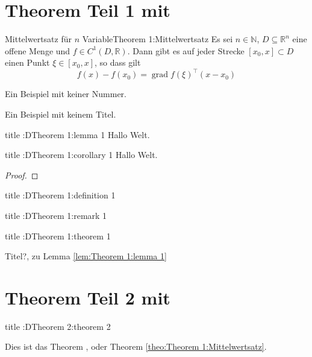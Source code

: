 \chapter{Theorem Teil 1 mit \texorpdfstring{}{tcolorbox}}%
\label{chap:Theorem 1}%
\lipsum[1-1]%
\begin{theorem}{Mittelwertsatz f\"{u}r $n$ Variable}{Theorem 1:Mittelwertsatz}%
	Es sei $n\in\mathbb{N}$, $D\subseteq\mathbb{R}^n$ eine offene Menge und $f\in C^{1}(D,\mathbb{R})$. Dann gibt es auf jeder Strecke $[x_0,x]\subset D$ einen Punkt $\xi\in[x_0,x]$, so dass gilt%
	\begin{equation*}%
	f(x)-f(x_0) = \operatorname{grad} f(\xi)^{\top}(x-x_0)%
	\end{equation*}%
\end{theorem}%
\begin{theorem*}{}{}%
	Ein Beispiel mit keiner Nummer.%
\end{theorem*}%
\begin{theorem}{}{}%
	Ein Beispiel mit keinem Titel.%
\end{theorem}%
\begin{lemma}{title :D}{Theorem 1:lemma 1}%
	Hallo Welt.
\end{lemma}%
\begin{corollary}{title :D}{Theorem 1:corollary 1}%
	Hallo Welt.
\end{corollary}%
\begin{proof}{}{}%
	\lipsum[1-3]
\end{proof}

\begin{definition}{title :D}{Theorem 1:definition 1}%
	\lipsum[1-1]
\end{definition}%
\begin{remark}{title :D}{Theorem 1:remark 1}%
	\lipsum[1-1]
\end{remark}%

\begin{theorem}{title :D}{Theorem 1:theorem 1}%
	\lipsum[1-1]
\end{theorem}%
\begin{proof*}{Titel?, zu Lemma \ref{lem:Theorem 1:lemma 1}}%
	\lipsum[1-1]
\end{proof*}

\chapter{Theorem Teil 2 mit \texorpdfstring{}{tcolorbox}}%
\label{chap:Theorem 2}%
\begin{theorem}{title :D}{Theorem 2:theorem 2}%
	\lipsum[1-1]
\end{theorem}%
Dies ist das Theorem , oder Theorem \ref{theo:Theorem 1:Mittelwertsatz}. \lipsum[1-1]%
\newpage%
\layout%
\newpage%


